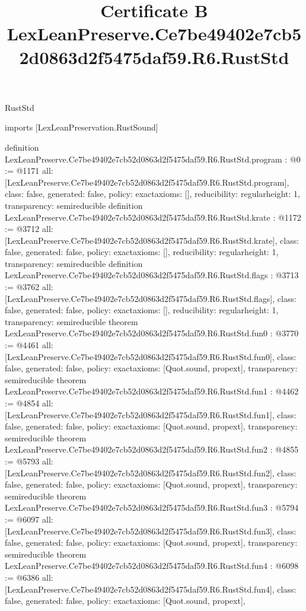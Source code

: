 \begin{lexlean}{RustStd}
\title{Certificate B LexLeanPreserve.Ce7be49402e7cb52d0863d2f5475daf59.R6.RustStd}
\begin{coremodule}
imports [LexLeanPreservation.RustSound]

definition LexLeanPreserve.Ce7be49402e7cb52d0863d2f5475daf59.R6.RustStd.program : @0 := @1171 {
  all: [LexLeanPreserve.Ce7be49402e7cb52d0863d2f5475daf59.R6.RustStd.program],
  class: false,
  generated: false,
  policy: exact{axioms: []},
  reducibility: regular{height: 1},
  transparency: semireducible
}
definition LexLeanPreserve.Ce7be49402e7cb52d0863d2f5475daf59.R6.RustStd.krate : @1172 := @3712 {
  all: [LexLeanPreserve.Ce7be49402e7cb52d0863d2f5475daf59.R6.RustStd.krate],
  class: false,
  generated: false,
  policy: exact{axioms: []},
  reducibility: regular{height: 1},
  transparency: semireducible
}
definition LexLeanPreserve.Ce7be49402e7cb52d0863d2f5475daf59.R6.RustStd.flags : @3713 := @3762 {
  all: [LexLeanPreserve.Ce7be49402e7cb52d0863d2f5475daf59.R6.RustStd.flags],
  class: false,
  generated: false,
  policy: exact{axioms: []},
  reducibility: regular{height: 1},
  transparency: semireducible
}
theorem LexLeanPreserve.Ce7be49402e7cb52d0863d2f5475daf59.R6.RustStd.fun0 : @3770 := @4461 {
  all: [LexLeanPreserve.Ce7be49402e7cb52d0863d2f5475daf59.R6.RustStd.fun0],
  class: false,
  generated: false,
  policy: exact{axioms: [Quot.sound, propext]},
  transparency: semireducible
}
theorem LexLeanPreserve.Ce7be49402e7cb52d0863d2f5475daf59.R6.RustStd.fun1 : @4462 := @4854 {
  all: [LexLeanPreserve.Ce7be49402e7cb52d0863d2f5475daf59.R6.RustStd.fun1],
  class: false,
  generated: false,
  policy: exact{axioms: [Quot.sound, propext]},
  transparency: semireducible
}
theorem LexLeanPreserve.Ce7be49402e7cb52d0863d2f5475daf59.R6.RustStd.fun2 : @4855 := @5793 {
  all: [LexLeanPreserve.Ce7be49402e7cb52d0863d2f5475daf59.R6.RustStd.fun2],
  class: false,
  generated: false,
  policy: exact{axioms: [Quot.sound, propext]},
  transparency: semireducible
}
theorem LexLeanPreserve.Ce7be49402e7cb52d0863d2f5475daf59.R6.RustStd.fun3 : @5794 := @6097 {
  all: [LexLeanPreserve.Ce7be49402e7cb52d0863d2f5475daf59.R6.RustStd.fun3],
  class: false,
  generated: false,
  policy: exact{axioms: [Quot.sound, propext]},
  transparency: semireducible
}
theorem LexLeanPreserve.Ce7be49402e7cb52d0863d2f5475daf59.R6.RustStd.fun4 : @6098 := @6386 {
  all: [LexLeanPreserve.Ce7be49402e7cb52d0863d2f5475daf59.R6.RustStd.fun4],
  class: false,
  generated: false,
  policy: exact{axioms: [Quot.sound, propext]},
}
\end{coremodule}
\end{lexlean}
